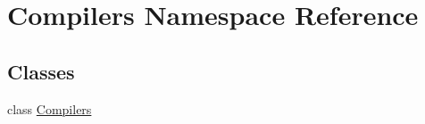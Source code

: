 \hypertarget{namespaceCompilers}{\section{Compilers Namespace Reference}
\label{namespaceCompilers}
}
\subsection*{Classes}
\begin{DoxyCompactItemize}
\item 
class \hyperlink{classCompilers_1_1Compilers}{Compilers}
\end{DoxyCompactItemize}
